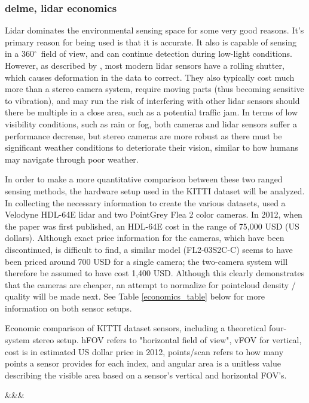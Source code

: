 \subsubsection{delme, lidar economics}
\def \deg {$^{\circ}$\ } %

Lidar dominates the environmental sensing space for some very good reasons. It's primary reason for being used is that it is accurate. It also is capable of sensing in a 360\deg field of view, and can continue detection during low-light conditions. However, as described by \cite{broggi_sensors_2013}, most modern lidar sensors have a rolling shutter, which causes deformation in the data to correct. They also typically cost much more than a stereo camera system, require moving parts (thus becoming sensitive to vibration), and may run the risk of interfering with other lidar sensors should there be multiple in a close area, such as a potential traffic jam. In terms of low visibility conditions, such as rain or fog, both cameras and lidar sensors suffer a performance decrease, but stereo cameras are more robust as there must be significant weather conditions to deteriorate their vision, similar to how humans may navigate through poor weather.


In order to make a more quantitative comparison between these two ranged sensing methods, the hardware setup used in the KITTI dataset will be analyzed. In collecting the necessary information to create the various datasets, \cite{geiger_are_2012} used a Velodyne HDL-64E lidar and two PointGrey Flea 2 color cameras. In 2012, when the paper was first published, an HDL-64E cost in the range of 75,000 USD (US dollars). Although exact price information for the cameras, which have been discontinued, is difficult to find, a similar model (FL2-03S2C-C) seems to have been priced around 700 USD for a single camera; the two-camera system will therefore be assumed to have cost 1,400 USD. Although this clearly demonstrates that the cameras are cheaper, an attempt to normalize for pointcloud density / quality will be made next. See Table \ref{economics_table} below for more information on both sensor setups. 

\def \b #1{\textbf{#1}} 
\begin{table}[h]
	\centering
	\caption{Economic comparison of KITTI dataset sensors, including a theoretical four-system stereo setup. hFOV refers to "horizontal field of view", vFOV for vertical, cost is in estimated US dollar price in 2012, points/scan refers to how many points a sensor provides for each index, and angular area is a unitless value describing the visible area based on a sensor's vertical and horizontal FOV's. }
	\csvreader[tabular=|c|c|c|c|,
	separator=semicolon,
	table head=\hline \b{Property} & \b{Lidar} & \b{Stereo (x1)} & \b{Stereo (x4)} \\\hline,
	late after line=\\\hline
	]%
	{../media/economics_table.csv}{}%
	{\csvcoli&\csvcolii&\csvcoliii&\csvcoliv}%
	\label{economics_table}
\end{table}

